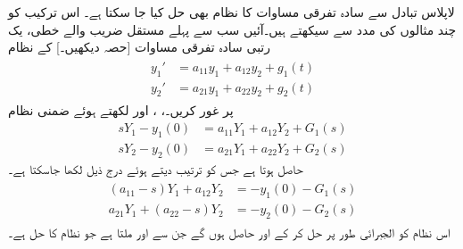 لاپلاس تبادل سے سادہ تفرقی مساوات کا نظام بھی حل کیا جا سکتا ہے۔ اس ترکیب کو چند مثالوں کی مدد سے سیکھتے ہیں۔آئیں سب سے پہلے مستقل  ضریب  والے خطی، یک رتبی سادہ تفرقی مساوات [حصہ  دیکھیں۔] کے نظام
\begin{gather}
\begin{aligned}\label{مساوات_لاپلاس_نظام_خطی_ایک_درجی_الف}
y_1'&=a_{11}y_1+a_{12}y_2+g_1(t)\\
y_2'&=a_{21}y_1+a_{22}y_2+g_2(t)
\end{aligned}
\end{gather}
پر غور کریں۔، ،  اور  لکھتے ہوئے ضمنی نظام
\begin{align*}
sY_1-y_1(0)&=a_{11}Y_1+a_{12}Y_2+G_1(s)\\
sY_2-y_2(0)&=a_{21}Y_1+a_{22}Y_2+G_2(s)
\end{align*}
حاصل ہوتا ہے جس کو ترتیب دیتے ہوئے  درج ذیل لکھا جاسکتا ہے۔
 \begin{gather}
\begin{aligned}\label{مساوات_لاپلاس_نظام_خطی_ایک_درجی_ب}
(a_{11}-s)Y_1+a_{12}Y_2&=-y_1(0)-G_1(s)\\
a_{21}Y_1+(a_{22}-s)Y_2&=-y_2(0)-G_2(s)
\end{aligned}
\end{gather}
اس نظام کو الجبرائی طور پر حل کر کے  اور  حاصل ہوں گے جن سے  اور   ملتا ہے جو نظام کا حل ہے۔

